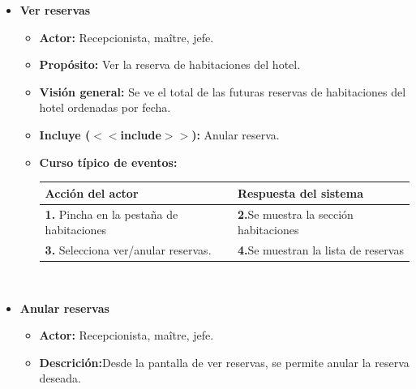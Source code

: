 \documentclass[spanish,a4paper,12pt]{report}		%
\begin{document}
\begin{itemize}
	\item \textbf{Ver reservas}
		\begin{itemize}
			\item \textbf{Actor:} Recepcionista, maître, jefe.
			\item \textbf{Propósito: } Ver la reserva de habitaciones del hotel.
			\item \textbf{Visión general:} Se ve el total de las futuras reservas de habitaciones del hotel ordenadas por fecha.
			\item \textbf{Incluye ($<<$include$>>$):} Anular reserva.
			\item \textbf{Curso típico de eventos:} 	\\
				\begin{tabular}{|p{6cm}||p{6cm}|}
				\hline
				\textbf{Acción del actor} & \textbf{Respuesta del sistema} \\ \hline
				\textbf{1.} Pincha en la pestaña de habitaciones & \textbf{2.}Se muestra la sección habitaciones \\ \hline 
				\textbf{3.} Selecciona ver/anular reservas. & \textbf{4.}Se muestran la lista de reservas \\ \hline
			\end{tabular}
			\\
		\end {itemize}


	\item \textbf{Anular reservas}
		\begin{itemize}
			\item \textbf{Actor:} Recepcionista, maître, jefe.
			\item \textbf{Descrición:}Desde la pantalla de ver reservas, se permite anular la reserva deseada. 		
		\end {itemize}



\end{itemize}
\end{document}

